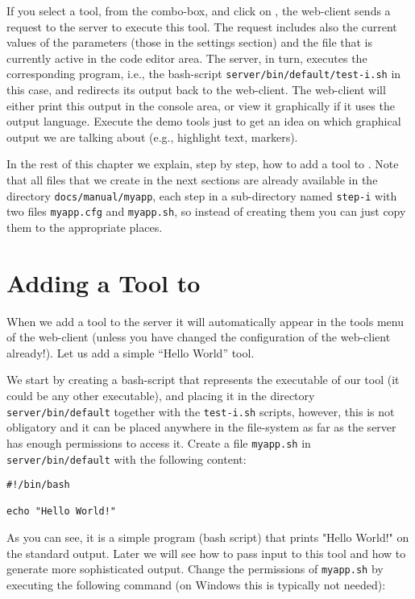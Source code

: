 If you select a tool, from the combo-box, and click on \applybutton,
the web-client sends a request to the server to execute this tool. The
request includes also the current values of the parameters (those in
the settings section) and the file that is currently active in the
code editor area.
%
The server, in turn, executes the corresponding program, i.e., the
bash-script \texttt{server/bin/default/test-i.sh} in this case, and
redirects its output back to the web-client.
%
The web-client will either print this output in the console area, or
view it graphically if it uses the \ei output language. Execute the
demo tools just to get an idea on which graphical output we are
talking about (e.g., highlight text, markers).

In the rest of this chapter we explain, step by step, how to add a
tool to \ei.
%
Note that all files that we create in the next sections are already
available in the directory \texttt{docs/manual/myapp}, each step in a
sub-directory named \texttt{step-i} with two files \texttt{myapp.cfg}
and \texttt{myapp.sh}, so instead of creating them you can just copy
them to the appropriate places.



\section{Adding a Tool to \ei}

When we add a tool to the \ei server it will automatically appear in
the tools menu of the web-client (unless you have changed the
configuration of the web-client already!).
%
Let us add a simple ``Hello World'' tool.

We start by creating a bash-script that represents the executable of
our tool (it could be any other executable), and placing it in the
directory \texttt{server/bin/default} together with the
\texttt{test-i.sh} scripts, however, this is not obligatory and it can
be placed anywhere in the file-system as far as the server has enough
permissions to access it.
%
Create a file \texttt{myapp.sh} in \texttt{server/bin/default} with
the following content:

\medskip
\begin{lstlisting}[style=script]
#!/bin/bash

echo "Hello World!"
\end{lstlisting}

\medskip
\noindent
As you can see, it is a simple program (bash script) that prints
"Hello World!" on the standard output. Later we will see how to pass
input to this tool and how to generate more sophisticated output.
%
Change the permissions of \texttt{myapp.sh} by executing the following
command (on Windows this is typically not needed):

